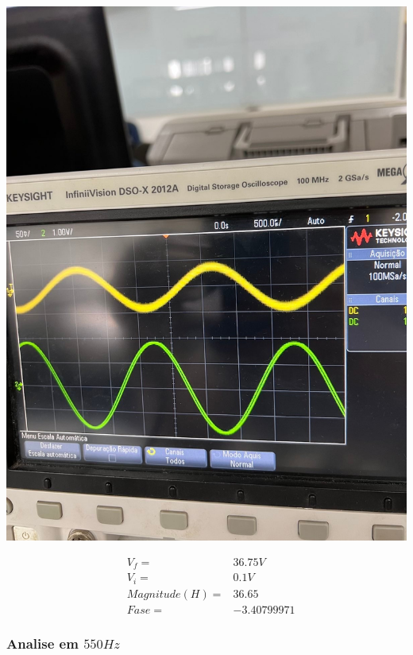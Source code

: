 \documentclass[12pt,twoside, a4paper, twocolumn]{article}
\begin{document}
\begin{adjustbox}{scale=0.18}
    \includegraphics{freq480.jpeg}
\end{adjustbox}


\begin{equation*}
    \begin{aligned}
         & V_f =          & 36.75V      \\
         & V_i =          & 0.1V        \\
         & Magnitude(H) = & 36.65       \\
         & Fase =         & -3.40799971
    \end{aligned}
\end{equation*}


\subsubsection{Analise em $550Hz$}
\subparagraph*{}
\end{document}
